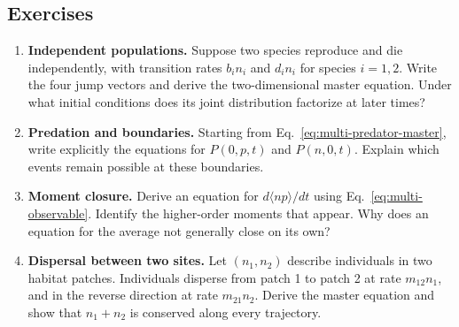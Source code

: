 \subsection{Exercises}
\label{subsec:multi-exercises}
\begin{enumerate}
 \item \textbf{Independent populations.} Suppose two species reproduce and die independently, with transition rates $b_i n_i$ and $d_i n_i$ for species $i=1,2$. Write the four jump vectors and derive the two-dimensional master equation. Under what initial conditions does its joint distribution factorize at later times?
 \item \textbf{Predation and boundaries.} Starting from Eq.~\eqref{eq:multi-predator-master}, write explicitly the equations for $P(0,p,t)$ and $P(n,0,t)$. Explain which events remain possible at these boundaries.
 \item \textbf{Moment closure.} Derive an equation for $d\langle np\rangle/dt$ using Eq.~\eqref{eq:multi-observable}. Identify the higher-order moments that appear. Why does an equation for the average not generally close on its own?
 \item \textbf{Dispersal between two sites.} Let $(n_1,n_2)$ describe individuals in two habitat patches. Individuals disperse from patch 1 to patch 2 at rate $m_{12}n_1$, and in the reverse direction at rate $m_{21}n_2$. Derive the master equation and show that $n_1+n_2$ is conserved along every trajectory.
\end{enumerate}
